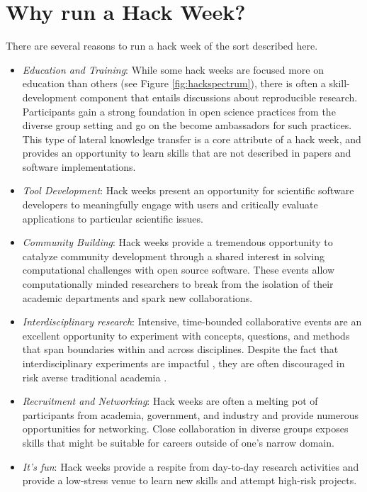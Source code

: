 \section*{Why run a Hack Week?}

There are several reasons to run a hack week of the sort described here.

\begin{itemize}
\item{\textit{Education and Training}:
While some hack weeks are focused more on education than others (see Figure \ref{fig:hackspectrum}), there is often a skill-development component that entails discussions about reproducible research. Participants gain a strong foundation in open science practices from the diverse group setting and go on the become ambassadors for such practices. This type of lateral knowledge transfer is a core attribute of a hack week, and provides an opportunity to learn skills that are not described in papers and software implementations.}

\item{\textit{Tool Development}: Hack weeks present an opportunity for scientific software developers to meaningfully engage with users and critically evaluate applications to particular scientific issues.}

\item{\textit{Community Building}: Hack weeks provide a tremendous opportunity to catalyze community development through a shared interest in solving computational challenges with open source software. These events allow computationally minded researchers to break from the isolation of their academic departments and spark new collaborations.}


\item{\textit{Interdisciplinary research}: Intensive, time-bounded collaborative events are an excellent opportunity to experiment with concepts, questions, and methods that span boundaries within and across disciplines. Despite the fact that interdisciplinary experiments are impactful \cite{Hall2012-hi}, they are often discouraged in risk averse traditional academia \cite{Sung2003-go}}.

\item{\textit{Recruitment and Networking}: Hack weeks are often a melting pot of participants from academia, government, and industry and provide numerous opportunities for networking. Close collaboration in diverse groups exposes skills that might be suitable for careers outside of one's narrow domain.}

\item{\textit{It's fun}: Hack weeks provide a respite from day-to-day research activities and provide a low-stress venue to learn new skills and attempt high-risk projects.}

\end{itemize}

